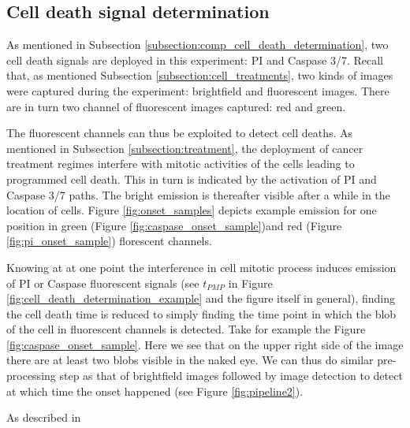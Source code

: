 \documentclass[pdftex,12pt,a4paper]{report}
\begin{document}
\subsection{Cell death signal determination}
\label{subsection:cell_death_signal_determination}


As mentioned in Subsection \ref{subsection:comp_cell_death_determination}, two cell death signals are deployed in this experiment: PI and Caspase 3/7. Recall that, as mentioned Subsection \ref{subsection:cell_treatments}, two kinds of images were captured during the experiment: brightfield and fluorescent images. There are in turn two channel of fluorescent images captured: red and green.

The fluorescent channels can thus be exploited to detect cell deaths. As mentioned in Subsection \ref{subsection:treatment}, the deployment of cancer treatment regimes interfere with mitotic activities of the cells leading to programmed cell death. This in turn is indicated by the activation of PI and Caspase 3/7 paths. The bright emission is thereafter visible after a while in the location of cells. Figure \ref{fig:onset_samples} depicts example emission for one position in green (Figure \ref{fig:caspase_onset_sample})and red (Figure \ref{fig:pi_onset_sample}) florescent channels.

Knowing at at one point the interference in cell mitotic process induces emission of PI or Caspase fluorescent signals (see $t_{PMP}$ in Figure \ref{fig:cell_death_determination_example} and the figure itself in general), finding the cell death time is reduced to simply finding the time point in which the blob of the cell in fluorescent channels is detected. Take for example the Figure \ref{fig:caspase_onset_sample}. Here we see that on the upper right side of the image there are at least two blobs visible in the naked eye. We can thus do similar pre-processing step as that of brightfield images followed by image detection to detect at which time the onset happened (see Figure \ref{fig:pipeline2}).


As described in 
\end{document}
